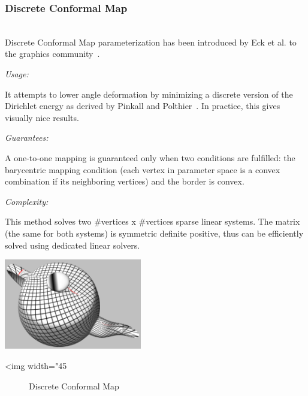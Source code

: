 \subsubsection{Discrete Conformal Map}

  \\

Discrete Conformal Map parameterization has been introduced by Eck et
al. to the graphics community~\cite{cgal:eddhls-maam-95}.

\emph{Usage:}

It attempts to
lower angle deformation by minimizing a discrete version of the
Dirichlet energy as derived by Pinkall and
Polthier~\cite{cgal:fh-survey-05}.
In practice, this gives visually nice results.


\emph{Guarantees:}

A one-to-one mapping is guaranteed only when two conditions are
fulfilled: the barycentric mapping condition (each vertex in parameter
space is a convex combination if its neighboring vertices) and the
border is convex.


\emph{Complexity:}

This method solves two \#vertices x \#vertices sparse linear
systems. The matrix (the same for both systems) is symmetric definite
positive, thus can be efficiently solved using dedicated linear
solvers.

\begin{center}
    \label{Surface_mesh_parameterization-fig-conformal}
    \begin{ccTexOnly}
        \includegraphics[width=0.45\textwidth]{Surface_mesh_parameterization/conformal}
    \end{ccTexOnly}
    \begin{ccHtmlOnly}
        <img width="45%
    \end{ccHtmlOnly}
    \begin{figure}[h]
        \caption{Discrete Conformal Map}
    \end{figure}
\end{center}

